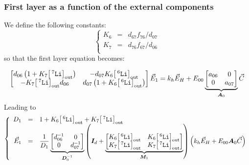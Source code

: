 \documentclass[aps,onecolumn,11pt]{revtex4}
\newcommand{\mychem}[1]{\mathtt{#1}}
\newcommand{\myconc}[1]{\big[#1\big]}
\newcommand{\spLi}[1]{{\!~^{#1}\mychem{Li}}}
\newcommand{\Li}[1]{\myconc{\spLi{#1}}}
\newcommand{\myout}[1]{{#1}_{\tiny\mathrm{out}}}
\newcommand{\LiOut}[1]{\myout{\Li{#1}}}
\newcommand{\mymat}[1]{{\bm{#1}}}
\begin{document}
\subsubsection{First layer as a function of the external components}
We define the following constants:
\begin{equation}
\left\lbrace
\begin{array}{rcl}
K_6 & = & d_{67} f_{76}/d_{07} \\
K_7 & = &  d_{76} f_{67}/d_{06}\\
\end{array}
\right.
\end{equation}
so that the first layer equation becomes:
	
\begin{equation}
\begin{bmatrix}
d_{06} \left(1+ K_7\LiOut{7}\right) & -d_{07}K_6\LiOut{6}\\
-K_7\LiOut{7}d_{06} & d_{07}\left(1 + K_6\LiOut{6}\right) \\
\end{bmatrix}
\vec{E}_1 = k_h \vec{E}_H 
+ E_{00}
\underbrace{
\begin{bmatrix}
a_{06} & 0 \\
0 & a_{07} \\
\end{bmatrix}
}_{\mymat{A}_0}
\vec{C}
\end{equation}
Leading to
\begin{equation}
\left\lbrace
\begin{array}{rcl}
D_1 & = & 1 +    K_6\LiOut{6} +  K_7 \LiOut{7}  \\
\vec{E}_1 & = &\dfrac{1}{D_1}
\underbrace{
\begin{bmatrix}
d_{06}^{-1} & 0 \\
0 & d_{07}^{-1} \\
\end{bmatrix}
}_{\mymat{D}_0^{-1}}
\left(
\mymat{I}_d+
\underbrace{
	\begin{bmatrix}
	K_6\LiOut{6} & K_6\LiOut{6}\\
	K_7\LiOut{7} & K_7 \LiOut{7}\\
	\end{bmatrix}
	}_{\mymat{M}_1}
		\right)
	\left( 
	k_h \vec{E}_H + E_{00} \mymat{A}_0 \vec{C}
	\right)
	\\
\end{array}
\right.
\end{equation}
\end{document}
